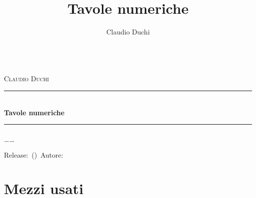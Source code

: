 \documentclass[openany,a4paper]{book}%
\title{Tavole numeriche}
\author{Claudio Duchi}
\date{\datetime}
\makeatletter
\newcommand{\HRule}{\rule{\linewidth}{0.5mm}}
\renewcommand\frontmatter{%
\cleardoublepage
\@mainmatterfalse
}
\renewcommand\mainmatter{%
\cleardoublepage
\@mainmattertrue
}
\makeatother
\begin{document}
\frontmatter
\hypersetup{pageanchor=false}
\begin{titlepage}
\begin{center}
	\Lgrandedue\\[1cm]    
\textsc{\LARGE Claudio Duchi}\\[1.5cm]
\HRule\\[0.4cm]
{ \huge \bfseries Tavole numeriche}\\[0.4cm]
\HRule\\[1.5cm]
\vfill
{\large $-$\DTMnow$-$}
\end{center}
{\centering
Release:\gitReln\ (\gitAbbrevHash)\ Autore:\gitAuthorName\ 
\gitCommitterDate \\
}

\end{titlepage}
\hypersetup{pageanchor=true}
\CDcopyright
\tableofcontents
\mainmatter
%	 
\cleardoublepage
{}
\printindex
\appendix
\chapter{Mezzi usati}
\CDMezziUsati
\end{document}
